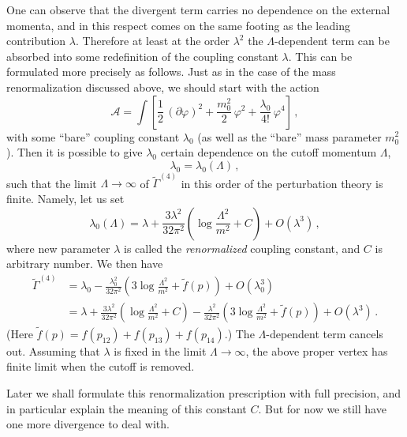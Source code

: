 One can observe that the divergent term carries no dependence on the external
momenta, and in this respect comes on the same footing as the leading
contribution $\lambda$. Therefore at least at the order $\lambda^2$ the
$\Lambda$-dependent term can be absorbed into some redefinition of the coupling
constant $\lambda$. This can be formulated more precisely as follows. Just as
in the case of the mass renormalization discussed above, we should start with
the action
\[
\mathcal A=\int\left[\frac12\,(\partial\varphi)^2+\frac{m_0^2}2\,\varphi^2+\frac{\lambda_0}{4!}\,\varphi^4\right]\,,
\]
with some ``bare'' coupling constant $\lambda_0$ (as well as the ``bare'' mass
parameter $m_0^2$). Then it is possible to give $\lambda_0$ certain dependence
on the cutoff momentum $\Lambda$,
\[
\lambda_0=\lambda_0(\Lambda)\,,
\]
such that the limit $\Lambda\to\infty$ of $\tilde\Gamma^{(4)}$ in this order of
the perturbation theory is finite. Namely, let us set
\[
\lambda_0(\Lambda)=\lambda+\frac{3\lambda^2}{32\pi^2}\left(\log\frac{\Lambda^2}{m^2}+C\right)+O(\lambda^3)\,,
\]
where new parameter $\lambda$ is called the \emph{renormalized} coupling
constant, and $C$ is arbitrary number. We then have
\begin{align*}
\tilde\Gamma^{(4)}&=\lambda_0-\frac{\lambda_0^2}{32\pi^2}\left(3\log\frac{\Lambda^2}{m^2}+\tilde f(p)\right)+O(\lambda_0^3)\\
&=\lambda+\frac{3\lambda^2}{32\pi^2}\left(\log\frac{\Lambda^2}{m^2}+C\right)-\frac{\lambda^2}{32\pi^2}\left(3\log\frac{\Lambda^2}{m^2}+\tilde f(p)\right)+O(\lambda^3)\,.
\end{align*}
(Here $\tilde f(p)=f(p_{12})+f(p_{13})+f(p_{14})$.) The $\Lambda$-dependent term
cancels out. Assuming that $\lambda$ is fixed in the limit $\Lambda\to\infty$,
the above proper vertex has finite limit when the cutoff is removed.

Later we shall formulate this renormalization prescription with full
precision, and in particular explain the meaning of this constant $C$. But for
now we still have one more divergence to deal with.

